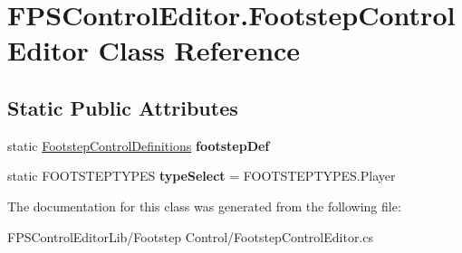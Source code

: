 \hypertarget{class_f_p_s_control_editor_1_1_footstep_control_editor}{\section{F\-P\-S\-Control\-Editor.\-Footstep\-Control\-Editor Class Reference}
\label{class_f_p_s_control_editor_1_1_footstep_control_editor}
}
\subsection*{Static Public Attributes}
\begin{DoxyCompactItemize}
\item 
\hypertarget{class_f_p_s_control_editor_1_1_footstep_control_editor_a1bff9bdc7e00bb0b19f29b4d06bb8441}{static \hyperlink{class_f_p_s_control_1_1_footstep_control_definitions}{Footstep\-Control\-Definitions} {\bfseries footstep\-Def}}\label{class_f_p_s_control_editor_1_1_footstep_control_editor_a1bff9bdc7e00bb0b19f29b4d06bb8441}

\item 
\hypertarget{class_f_p_s_control_editor_1_1_footstep_control_editor_ad532addf4eeb9fdf153a1634bc6007e3}{static F\-O\-O\-T\-S\-T\-E\-P\-T\-Y\-P\-E\-S {\bfseries type\-Select} = F\-O\-O\-T\-S\-T\-E\-P\-T\-Y\-P\-E\-S.\-Player}\label{class_f_p_s_control_editor_1_1_footstep_control_editor_ad532addf4eeb9fdf153a1634bc6007e3}

\end{DoxyCompactItemize}


The documentation for this class was generated from the following file\-:\begin{DoxyCompactItemize}
\item 
F\-P\-S\-Control\-Editor\-Lib/\-Footstep Control/Footstep\-Control\-Editor.\-cs\end{DoxyCompactItemize}
